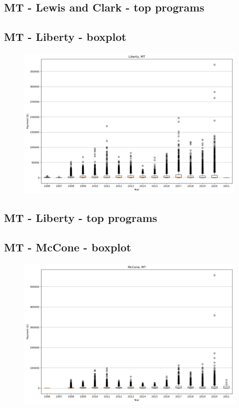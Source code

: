 \subsection*{MT - Lewis and Clark - top programs}

\newpage
\subsection*{MT - Liberty - boxplot}
\begin{figure}[h]
\centering
\includegraphics[width=7in]{../output/boxplots/counties/Liberty-MT_boxplot.png}
\end{figure}


\subsection*{MT - Liberty - top programs}

\newpage
\subsection*{MT - McCone - boxplot}
\begin{figure}[h]
\centering
\includegraphics[width=7in]{../output/boxplots/counties/McCone-MT_boxplot.png}
\end{figure}


